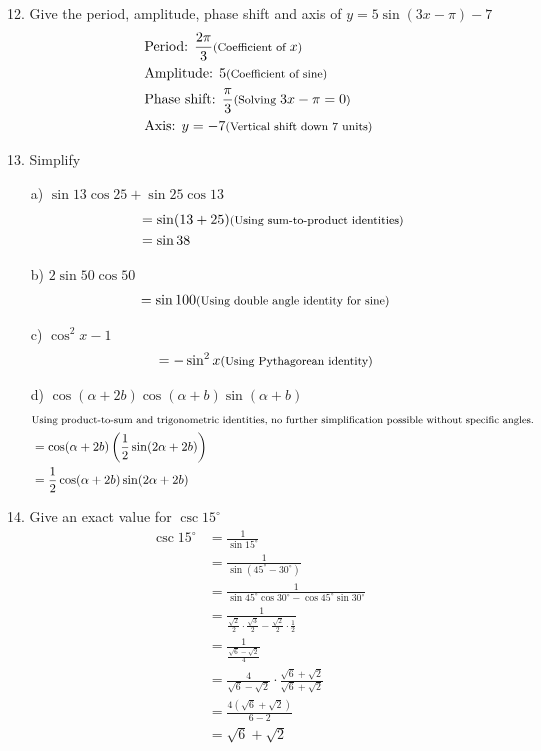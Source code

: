 \documentclass{article}
\newcommand{\smalltext}[1]{\text{\footnotesize #1}}
\begin{document}
12. Give the period, amplitude, phase shift and axis of \( y = 5\sin(3x - \pi) - 7 \)
\begin{align*}
    &\text{Period: } \frac{2\pi}{3} \smalltext{ (Coefficient of } x \smalltext{)} \\
    &\text{Amplitude: } 5 \smalltext{ (Coefficient of sine)} \\
    &\text{Phase shift: } \frac{\pi}{3} \smalltext{ (Solving } 3x - \pi = 0 \smalltext{)} \\
    &\text{Axis: } y = -7 \smalltext{ (Vertical shift down 7 units)}
\end{align*}

13. Simplify
\begin{enumerate}
    \item[a)] \( \sin 13 \cos 25 + \sin 25 \cos 13 \)
    \begin{align*}
        &= \sin(13 + 25) \smalltext{ (Using sum-to-product identities)} \\
        &= \sin 38
    \end{align*}
    \item[b)] \( 2\sin 50 \cos 50 \)
    \begin{align*}
        &= \sin 100 \smalltext{ (Using double angle identity for sine)}
    \end{align*}
    \item[c)] \( \cos^2 x - 1 \)
    \begin{align*}
        &= -\sin^2 x \smalltext{ (Using Pythagorean identity)}
    \end{align*}
    \item[d)] \( \cos(\alpha + 2b) \cos(\alpha + b) \sin(\alpha + b) \)
    \begin{align*}
        &\smalltext{Using product-to-sum and trigonometric identities, no further simplification possible without specific angles.}\\
        &= \cos(\alpha + 2b) \left(\frac{1}{2} \sin(2\alpha + 2b)\right) \\
        &= \frac{1}{2} \cos(\alpha + 2b) \sin(2\alpha + 2b)
    \end{align*}
\end{enumerate}

14. Give an exact value for \( \csc 15^{\circ} \)
\begin{align*}
    \csc 15^{\circ} &= \frac{1}{\sin 15^{\circ}} \\
    &= \frac{1}{\sin(45^{\circ} - 30^{\circ})} \\
    &= \frac{1}{\sin 45^{\circ} \cos 30^{\circ} - \cos 45^{\circ} \sin 30^{\circ}} \\
    &= \frac{1}{\frac{\sqrt{2}}{2} \cdot \frac{\sqrt{3}}{2} - \frac{\sqrt{2}}{2} \cdot \frac{1}{2}} \\
    &= \frac{1}{\frac{\sqrt{6} - \sqrt{2}}{4}} \\
    &= \frac{4}{\sqrt{6} - \sqrt{2}} \cdot \frac{\sqrt{6} + \sqrt{2}}{\sqrt{6} + \sqrt{2}} \\
    &= \frac{4(\sqrt{6} + \sqrt{2})}{6 - 2} \\
    &= \sqrt{6} + \sqrt{2}
\end{align*}
\end{document}
